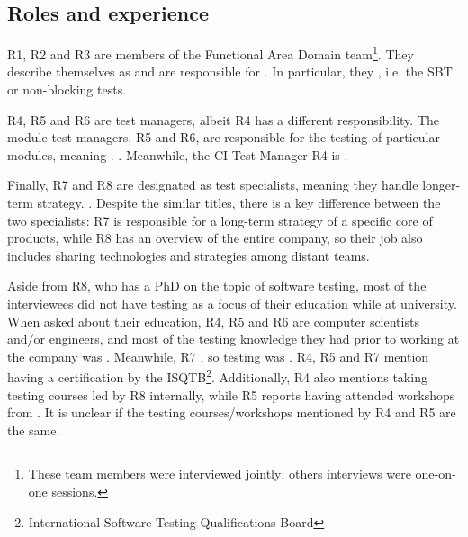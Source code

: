 \subsection{Roles and experience}

R1, R2 and R3 are members of the Functional Area Domain team\footnote{These team members were interviewed jointly; others interviews were one-on-one sessions.}.
They describe themselves as  and are responsible for .
In particular, they , i.e. the SBT or non-blocking tests.

R4, R5 and R6 are test managers, albeit R4 has a different responsibility.
The module test managers, R5 and R6, are responsible for the testing of particular modules, meaning .
.
Meanwhile, the CI Test Manager R4 is .

Finally, R7 and R8 are designated as test specialists, meaning they handle longer-term strategy.
.
Despite the similar titles, there is a key difference between the two specialists: R7 is responsible for a long-term strategy of a specific core of products, while R8 has an overview of the entire company, so their job also includes sharing technologies and strategies among distant teams.

Aside from R8, who has a PhD on the topic of software testing, most of the interviewees did not have testing as a focus of their education while at university.
When asked about their education, R4, R5 and R6 are computer scientists and/or engineers, and most of the testing knowledge they had prior to working at the company was .
Meanwhile, R7 , so testing was .
R4, R5 and R7 mention having a certification by the ISQTB\footnote{International Software Testing Qualifications Board}.
Additionally, R4 also mentions taking testing courses led by R8 internally, while R5 reports having attended workshops from .
It is unclear if the testing courses/workshops mentioned by R4 and R5 are the same.

